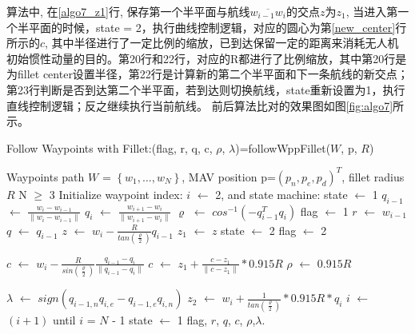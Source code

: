 \documentclass[UTF8,a4paper,10pt,nocolorlinks]{ctexart}
\begin{document}
    \par 算法中, 在\ref{algo7_z1}行, 保存第一个半平面与航线$\overline{w_{i-1}w_{i}}$的交点$z$为$z_{1}$, 
    当进入第一个半平面的时候，state = 2，执行曲线控制逻辑，对应的圆心为第\ref{new_center}行所示的$c$, 其中半径进行了一定比例的缩放，已到达保留一定的距离来消耗无人机初始惯性动量的目的。第20行和22行，对应的R都进行了比例缩放，其中第20行是为fillet center设置半径，第22行是计算新的第二个半平面和下一条航线的新交点；第23行判断是否到达第二个半平面，若到达则切换航线，state重新设置为1，执行直线控制逻辑；反之继续执行当前航线。
    前后算法比对的效果图如图\ref{fig:algo7}所示。
    \begin{algorithm}[t] %
        \caption{Follow Waypoints with Fillet:(flag, r, q, c, $\rho$, $\lambda$)=followWppFillet($\textit{W}$, p, $R$)}
        \label{algo6_opti:ref}
        \begin{algorithmic}[1]
            \ENSURE Waypoints path $\textit{W}$ = $\left\{ w_{1}, \dots, w_{N} \right\}$, MAV position p=$(p_{n}, p_{e}, p_{d})^{T}$, fillet radius $R$
            \REQUIRE N $\geq$ 3
                \STATE Initialize waypoint index: $i$ $\gets$ 2, and state machine: state $\gets$ 1
            \ENDIF
            \STATE $q_{i-1}$ $\gets$ $\frac{w_{i}-w_{i-1}}{\lVert w_{i}-w_{i-1} \rVert}$
            \STATE $q_{i}$ $\gets$ $\frac{w_{i+1}-w_{i}}{\lVert w_{i+1}-w_{i} \rVert}$
            \STATE $\varrho$ $\gets$ $cos^{-1}(-q_{i-1}^{T}q_{i})$
                \STATE flag $\gets$ 1
                \STATE $r$ $\gets$ $w_{i-1}$
                \STATE $q$ $\gets$ $q_{i-1}$
                \STATE $z$ $\gets$ $w_{i} - \frac{R}{tan(\frac{\varrho}{2})}q_{i-1}$
                \STATE $z_{1}$ $\gets$ $z$     \label{algo7_z1}   
                    \STATE state $\gets$ 2
                \ENDIF
                \STATE flag $\gets$ 2
                
                \STATE $c$ $\gets$ $w_{i} - \frac{R}{sin(\frac{\varrho}{2})}\frac{q_{i-1}-q_{i}}{\lVert q_{i-1}-q_{i} \rVert}$
                \STATE $c$ $\gets$ $z_{1} + \frac{c-z_{1}}{\lVert c-z_{1}\rVert}*0.915R$ %
                \label{new_center}
                \STATE $\rho$ $\gets$ $0.915R$

                \STATE $\lambda$ $\gets$ $sign(q_{i-1,n}q_{i,e}-q_{i-1,e}q_{i,n})$
                \STATE $z_{2}$ $\gets$ $w_{i} + \frac{1}{tan(\frac{\varrho}{2})}*0.915R*q_{i}$
                    \STATE $i$ $\gets$ $\left(i+1\right)$ until $i$ = $N$ - 1
                    \STATE state $\gets$ 1
                \ENDIF
            \ENDIF
            \RETURN flag, $r$, $q$, $c$, $\rho$,$\lambda$.  %
        \end{algorithmic}
    \end{algorithm}
\end{document}

